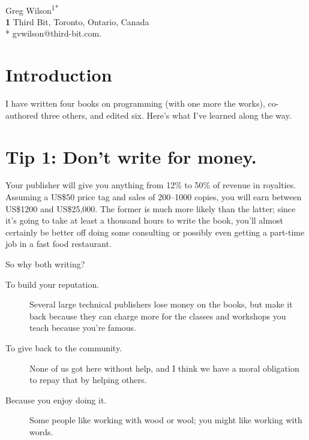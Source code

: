 \documentclass[10pt,letterpaper]{article}
\begin{document}
\vspace*{0.2in}

\begin{flushleft}
{\Large
\textbf{}
}
\newline
\\
{Greg Wilson}\textsuperscript{1*}
\\
\bigskip
\textbf{1} Third Bit, Toronto, Ontario, Canada\\
* gvwilson@third-bit.com. \\
\end{flushleft}

\section*{Introduction}

I have written four books on programming (with one more the works),
co-authored three others,
and edited six.
Here's what I've learned along the way.

\section*{Tip 1: Don't write for money.}

Your publisher will give you anything from 12\% to 50\% of revenue in royalties.
Assuming a US\$50 price tag and sales of 200–1000 copies,
you will earn between US\$1200 and US\$25,000.
The former is much more likely than the latter;
since it's going to take at least a thousand hours to write the book,
you'll almost certainly be better off doing some consulting
or possibly even getting a part-time job in a fast food restaurant.

So why both writing?

\begin{description}

\item[To build your reputation.]
  Several large technical publishers lose money on the books,
  but make it back because they can charge more for the classes and workshops you teach
  because you're famous.

\item[To give back to the community.]
  None of us got here without help,
  and I think we have a moral obligation to repay that by helping others.

\item[Because you enjoy doing it.]
  Some people like working with wood or wool;
  you might like working with words.

\end{description}
\end{document}
